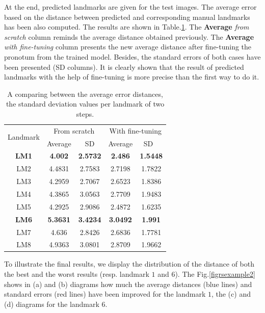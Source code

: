 \documentclass[10pt]{article}
\begin{document}
At the end, predicted landmarks are given for the test images. The average error based on the distance between
predicted and corresponding manual landmarks has been also computed. The results
are shown in Table.\ref{tab2}. The \textbf{Average} \textit{from scratch} column reminds
the average distance obtained previously. The \textbf{Average} \textit{with fine-tuning}
column presents the new average distance
after fine-tuning the pronotum from the trained model. Besides, the standard errors of both cases have been presented (SD columns). It is
clearly shown that the result of predicted landmarks with the help of
fine-tuning is more precise than the first way to do it.

\begin{table}[htbp]
\centering
\begin{tabular}{ | c | c | c | c | c | }
\hline
	\multicolumn{1}{|c|}{\multirow{2}{*}{Landmark}} & \multicolumn{2}{c|}{From scratch} &  \multicolumn{2}{c|}{With fine-tuning}  \\ \cline{2-5}
	 & Average & SD & Average & SD \  \\ \hline
	\textbf{LM1} & \textbf{4.002} & \textbf{2.5732} & \textbf{2.486} & \textbf{1.5448} \\ \hline
	LM2 & 4.4831 & 2.7583 & 2.7198 & 1.7822 \\ \hline
	LM3 & 4.2959 & 2.7067 & 2.6523 & 1.8386 \\ \hline
	LM4 & 4.3865 & 3.0563 & 2.7709 & 1.9483 \\ \hline
	LM5 & 4.2925 & 2.9086 & 2.4872 & 1.6235 \\ \hline
	\textbf{LM6} & \textbf{5.3631} & \textbf{3.4234} & \textbf{3.0492} & \textbf{1.991} \\ \hline
	LM7 & 4.636 & 2.8426 & 2.6836 & 1.7781 \\ \hline
	LM8 & 4.9363 & 3.0801 & 2.8709 & 1.9662 \\ \hline
\end{tabular}
\caption{\small{A comparing between the average error distances, the standard deviation values per landmark of two steps.}}
\label{tab2}
\end{table}

To illustrate the final results, we display the distribution of the
distance of both the best and the worst results (resp. landmark $1$
and $6$). The Fig.\ref{figrsexample2} shows in (a) and (b) diagrams
 how much the average distances (blue lines) and standard errors (red lines) have
 been improved for the landmark $1$, the (c) and (d) diagrams for the
 landmark $6$.
\end{document}
